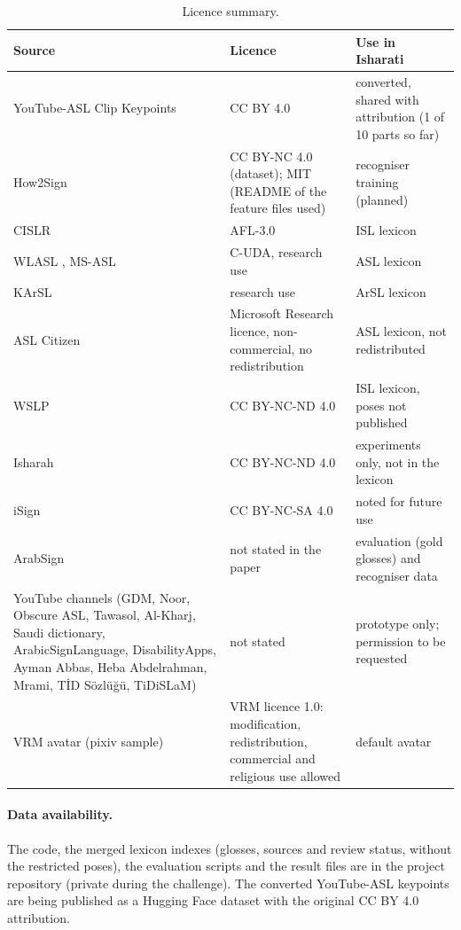 \begin{table}[ht]
\centering\small
\caption{Licence summary.}
\label{tab:licences}
\begin{tabularx}{\textwidth}{L{4.6cm} L{4.2cm} Y}
\toprule
Source & Licence & Use in Isharati \\
\midrule
YouTube-ASL Clip Keypoints \cite{youtubeaslkp} & CC BY 4.0 & converted, shared with attribution (1 of 10 parts so far) \\
How2Sign \cite{how2sign} & CC BY-NC 4.0 (dataset); MIT (README of the feature files used) & recogniser training (planned) \\
CISLR \cite{cislr} & AFL-3.0 & ISL lexicon \\
WLASL \cite{wlasl}, MS-ASL \cite{msasl} & C-UDA, research use & ASL lexicon \\
KArSL \cite{karsl} & research use & ArSL lexicon \\
ASL Citizen \cite{aslcitizen} & Microsoft Research licence, non-commercial, no redistribution & ASL lexicon, not redistributed \\
WSLP \cite{wslp} & CC BY-NC-ND 4.0 & ISL lexicon, poses not published \\
Isharah \cite{isharah} & CC BY-NC-ND 4.0 & experiments only, not in the lexicon \\
iSign \cite{isign} & CC BY-NC-SA 4.0 & noted for future use \\
ArabSign \cite{arabsign} & not stated in the paper & evaluation (gold glosses) and recogniser data \\
YouTube channels (GDM, Noor, Obscure ASL, Tawasol, Al-Kharj, Saudi dictionary, ArabicSignLanguage, DisabilityApps, Ayman Abbas, Heba Abdelrahman,
Mrami, T\.{I}D S\"ozl\"u\u{g}\"u, TiDiSLaM) & not stated & prototype only; permission to be requested \\
VRM avatar (pixiv sample) \cite{vrm} & VRM licence 1.0: modification, redistribution, commercial and religious use allowed & default avatar \\
\bottomrule
\end{tabularx}
\end{table}

\paragraph{Data availability.} The code, the merged lexicon indexes (glosses, sources and review status, without the
restricted poses), the evaluation scripts and the result files are in the project repository (private during the challenge). The converted YouTube-ASL keypoints are being published
as a Hugging Face dataset with the original CC BY 4.0 attribution.

